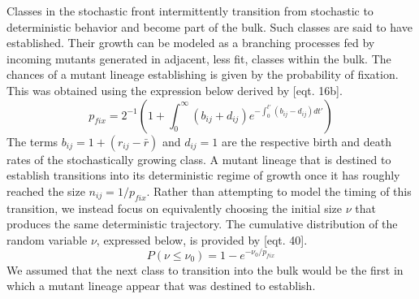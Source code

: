 \documentclass[9pt,twocolumn,twoside]{gsajnl}
\begin{document}
Classes in the stochastic front intermittently transition from stochastic to deterministic behavior and become part of the bulk. Such classes are said to have established. Their growth can be modeled as a branching processes fed by incoming mutants generated in adjacent, less fit, classes within the bulk.  The chances of a mutant lineage establishing is given by the probability of fixation.  This was obtained using the expression below derived by \citep{Uecker2011} [eqt. 16b].
% 
% 
% 
\begin{equation}
p_{fix} = 2^{-1}  \left(1 + \int_0^\infty (b_{ij} +d_{ij}) e^{-\int_0^{t'}(b_{ij}-d_{ij}) d t'} \right)
\end{equation}
The terms $b_{ij}=1+(r_{ij}-\bar{r})$ and $d_{ij}=1$ are the respective birth and death rates of the stochastically growing class. A mutant lineage that is destined to establish transitions into its deterministic regime of growth once it has roughly reached the size $n_{ij} = 1/p_{fix}$.  Rather than attempting to model the timing of this transition, we instead focus on equivalently choosing the initial size $\nu$ that produces the same deterministic trajectory.  The cumulative distribution of the random variable $\nu$, expressed below, is provided by \citep{Uecker2011} [eqt. 40].
\begin{equation}
P(\nu \leq \nu_0)= 1-e^{-\nu_0/p_{fix}}
\end{equation}
We assumed that the next class to transition into the bulk would be the first in which  a mutant lineage appear that was destined to establish.\par
\end{document}
